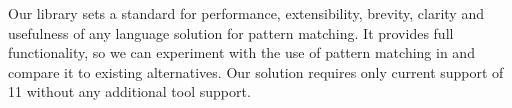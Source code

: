 
\noindent
Our library sets a standard for performance, extensibility, brevity, 
clarity and usefulness of any language solution for pattern matching.
It provides full functionality, so we can experiment with the use of 
pattern matching in \Cpp{} and compare it to existing alternatives.
Our solution requires only current support of \Cpp{}11 without any 
additional tool support.

